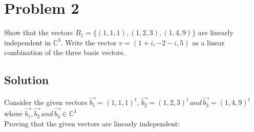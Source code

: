 \documentclass{article}
\begin{document}
\newpage

\section*{Problem 2}
Show that the vectors $B_1=\{(1,1,1), (1,2,3),(1,4,9)\}$ are linearly independent in ${\mathbb C}^3$. Write the vector $v = (1+i,−2-i,5)$ as a linear combination of the three basis vectors. 


\subsection*{Solution}

Consider the given vectors $\vec{b_1} = (1, 1, 1)^t, \, \vec{b_2} = (1, 2, 3)^t \, and \, \vec{b_3} = (1, 4, 9)^t$ where $\vec{b_1}, \vec{b_2} \, and \, \vec{b_3} \in \mathbb{C}^3 $\\

Proving that the given vectors are linearly independent: \\
\end{document}
